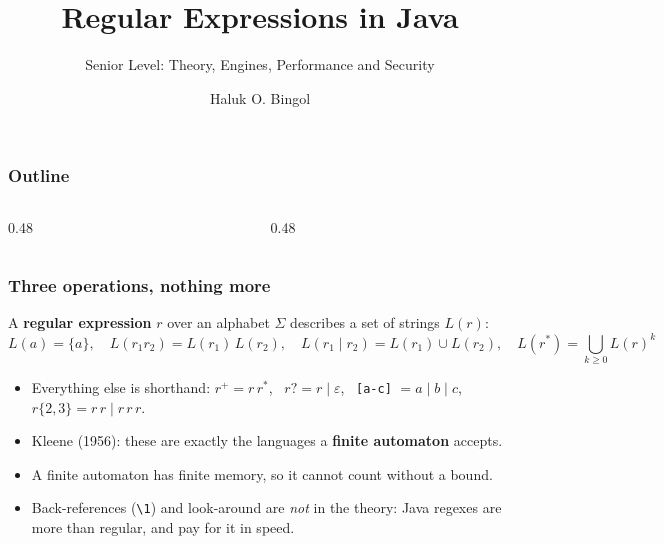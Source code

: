 \documentclass[aspectratio=169,10pt,compress]{beamer}
\title{Regular Expressions in Java}
\subtitle{Senior Level: Theory, Engines, Performance and Security}
\author[Bingol]{Haluk O. Bingol}
\institute[FCIS]{
    Faculty of Computer and Information Sciences\\
    Yeditepe University
}
\date{
	{\tiny \hbTimeStamp}
}
\begin{document}
\begin{frame}[t,fragile]
  \titlepage
\end{frame}




\begin{frame}[t,fragile] \frametitle{Outline}
  \begin{columns}[T]
    \begin{column}{0.48\textwidth}
      \tableofcontents[sections={1-4}, hideallsubsections]
    \end{column}
    \begin{column}{0.48\textwidth}
      \tableofcontents[sections={5-8}, hideallsubsections]
    \end{column}
  \end{columns}
\end{frame}





\begin{frame}[t,fragile] \frametitle{Three operations, nothing more}
  A \textbf{regular expression} $r$ over an alphabet $\Sigma$ describes a set of strings $L(r)$:
  \[
  	L(a) = \{a\}, \quad L(r_{1} r_{2}) = L(r_{1})\,L(r_{2}), \quad L(r_{1} \mid r_{2}) = L(r_{1}) \cup L(r_{2}), \quad L(r^{*}) = \bigcup_{k \ge 0} L(r)^{k}
  \]
  \begin{itemize}\small
    \item Everything else is shorthand: $r^{+} = r\,r^{*}$, \ $r? = r \mid \varepsilon$, \ \texttt{[a-c]} $= a \mid b \mid c$, \ $r\{2,3\} = r\,r \mid r\,r\,r$.
    \item Kleene (1956): these are exactly the languages a \textbf{finite automaton} accepts.
    \item A finite automaton has finite memory, so it cannot count without a bound.
    \item Back-references (\texttt{\textbackslash 1}) and look-around are \emph{not} in the theory: Java regexes are more than regular, and pay for it in speed.
  \end{itemize}
\end{frame}
\end{document}
